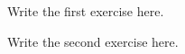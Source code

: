 \documentclass[11pt,a4paper]{exam}
\begin{document}
\begin{questions}

\question
Write the first exercise here.

\question
Write the second exercise here.

\end{questions}
\end{document}
